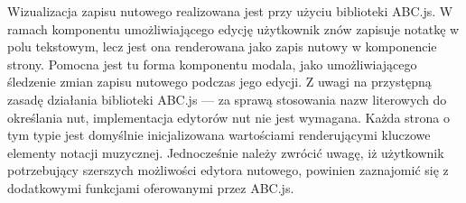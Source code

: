 Wizualizacja zapisu nutowego realizowana jest przy użyciu biblioteki ABC.js. W ramach komponentu umożliwiającego edycję
użytkownik znów zapisuje notatkę w polu tekstowym, lecz jest ona renderowana jako zapis nutowy w komponencie strony.
Pomocna jest tu forma komponentu modala,
jako umożliwiającego śledzenie zmian zapisu nutowego podczas jego edycji. Z uwagi na przystępną zasadę działania biblioteki
ABC.js — za sprawą stosowania nazw literowych do określania nut, implementacja edytorów nut nie jest wymagana.
Każda strona o tym typie jest domyślnie inicjalizowana wartościami renderującymi kluczowe elementy notacji muzycznej.
Jednocześnie należy zwrócić uwagę, iż użytkownik potrzebujący szerszych możliwości edytora nutowego, powinien zaznajomić
się z dodatkowymi funkcjami oferowanymi przez ABC.js.

\begin{figure}[H]
	\begin{center}

\end{center}
\end{figure}
